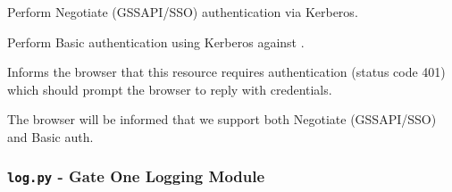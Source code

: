 \documentclass[letterpaper,10pt,openany]{sphinxmanual}
\begin{document}
\begin{fulllineitems}
\begin{fulllineitems}
\end{fulllineitems}


\begin{fulllineitems}
\label{Developer/sso:gateone.auth.sso.KerberosAuthMixin.auth_negotiate}
Perform Negotiate (GSSAPI/SSO) authentication via Kerberos.

\end{fulllineitems}


\begin{fulllineitems}
\label{Developer/sso:gateone.auth.sso.KerberosAuthMixin.auth_basic}
Perform Basic authentication using Kerberos against
.

\end{fulllineitems}


\begin{fulllineitems}
\label{Developer/sso:gateone.auth.sso.KerberosAuthMixin.authenticate_redirect}
Informs the browser that this resource requires authentication (status
code 401) which should prompt the browser to reply with credentials.

The browser will be informed that we support both Negotiate (GSSAPI/SSO)
and Basic auth.

\end{fulllineitems}


\end{fulllineitems}



\subsubsection{\texttt{log.py} - Gate One Logging Module}
\label{Developer/log:log-py-gate-one-logging-module}\label{Developer/log:module-gateone.core.log}\label{Developer/log::doc}
\end{document}

